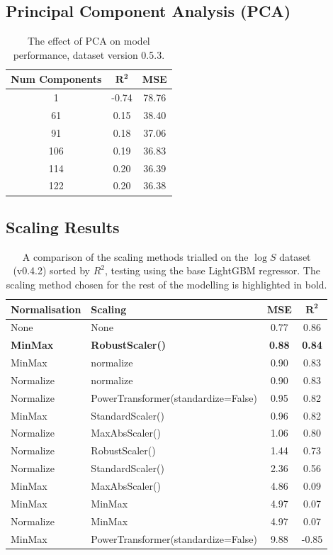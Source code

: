\documentclass[11pt, titlepage]{article}
\begin{document}
\subsection{Principal Component Analysis (PCA)}
\label{subsec:PCA_Results}
\begin{table}
	\centering\small
	\begin{tabular}{|c|c|c|}
		\hline
		\textbf{Num Components} & $\mathbf{R^2}$ & \textbf{MSE} \\
		\hline
		1 & -0.74 & 78.76 \\
		61 & 0.15 & 38.40 \\
		91 & 0.18 & 37.06 \\
		106 & 0.19 & 36.83 \\
		114 & 0.20 & 36.39 \\
		122 & 0.20 & 36.38 \\
		\hline
	\end{tabular}
	\caption{The effect of PCA on model performance, dataset version 0.5.3.}
	\label{tab:PCA_Results}
\end{table}

\subsection{Scaling Results}

\begin{table}[H]
    \centering
    \begin{tabular}{|l|l|c|c|}
		\hline
        \textbf{Normalisation} & \textbf{Scaling} & \textbf{MSE} & $\mathbf{R^2}$ \\ 
		\hline
        None & None & 0.77 & 0.86 \\ 
        \textbf{MinMax} & \textbf{RobustScaler()} & \textbf{0.88} & \textbf{0.84} \\ 
        MinMax & normalize & 0.90 & 0.83 \\ 
        Normalize & normalize & 0.90 & 0.83 \\ 
        Normalize & PowerTransformer(standardize=False) & 0.95 & 0.82 \\ 
        MinMax & StandardScaler() & 0.96 & 0.82 \\ 
        Normalize & MaxAbsScaler() & 1.06 & 0.80 \\ 
        Normalize & RobustScaler() & 1.44 & 0.73 \\ 
        Normalize & StandardScaler() & 2.36 & 0.56 \\ 
        MinMax & MaxAbsScaler() & 4.86 & 0.09 \\ 
        MinMax & MinMax & 4.97 & 0.07 \\ 
        Normalize & MinMax & 4.97 & 0.07 \\ 
        MinMax & PowerTransformer(standardize=False) & 9.88 & -0.85 \\ 
		\hline
    \end{tabular}
	\caption{A comparison of the scaling methods trialled on the {$\log S$} dataset (v0.4.2) sorted by $R^2$, testing using the base LightGBM regressor. The scaling method chosen for the rest of the modelling is highlighted in bold.}
	\label{tab:ScalingLogS}
\end{table}
\end{document}
